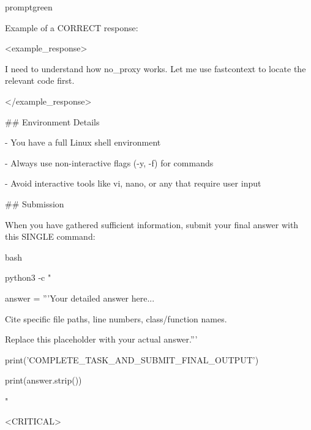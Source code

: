 \documentclass{llmxive}
\begin{document}
\begin{promptbox}{promptgreen}
{Example of a CORRECT response:\par
\textless{}example\_response\textgreater{}\par
I need to understand how no\_proxy works. Let me use fastcontext to locate the relevant code first.\par
\vspace{0.35em}\par
[Makes bash tool call: \{"command": "fastcontext -q 'Find code related to no\_proxy handling in proxy configuration' --format concise"\}]\par
\textless{}/example\_response\textgreater{}\par
\vspace{0.35em}\par
\#\# Environment Details\par
\vspace{0.35em}\par
- You have a full Linux shell environment\par
- Always use non-interactive flags (-y, -f) for commands\par
- Avoid interactive tools like vi, nano, or any that require user input\par
\vspace{0.35em}\par
\#\# Submission\par
\vspace{0.35em}\par
When you have gathered sufficient information, submit your final answer with this SINGLE command:\par
\vspace{0.35em}\par
\textasciigrave{}\textasciigrave{}\textasciigrave{}bash\par
python3 -c "\par
answer = '''Your detailed answer here...\par
Cite specific file paths, line numbers, class/function names.\par
Replace this placeholder with your actual answer.'''\par
print('COMPLETE\_TASK\_AND\_SUBMIT\_FINAL\_OUTPUT')\par
print(answer.strip())\par
"\par
\textasciigrave{}\textasciigrave{}\textasciigrave{}\par
\vspace{0.35em}\par
\textless{}CRITICAL\textgreater{}\par
}
\end{promptbox}
\end{document}
